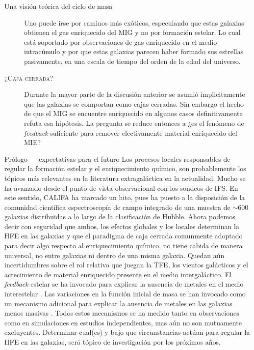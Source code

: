 \documentclass[xcolor=dvipsnames,4pt,hyperref={colorlinks,citecolor=black,linkcolor=black,urlcolor=black}]{beamer}
\begin{document}
\begin{frame}[allowframebreaks]{Una visión teórica del ciclo de masa}
\begin{description}
Uno puede irse por caminos más exóticos, especulando que estas galaxias obtienen el gas enriquecido
del MIG y no por formación estelar. Lo cual está soportado por observaciones de gas enriquecido en
el medio intracúmulo y por que estas galaxias parecen haber formado sus estrellas pasivamente, en
una escala de tiempo del orden de la edad del universo.
%
\item[\textsc{¿Caja cerrada?}] Durante la mayor parte de la discusión anterior se asumió
implicitamente que las galaxias se comportan como cajas cerradas. Sin embargo el hecho de que el MIG
se encuentre enriquecido en algunos casos definitivamente refuta esa hipótesis. La pregunta se
reduce entonces a ¿es el fenómeno de \emph{feedback} suficiente para remover efectivamente material
enriquecido del MIE?
%
\end{description}
\end{frame}

\begin{frame}[allowframebreaks]{Prólogo --- expectativas para el futuro}
%
Los procesos locales responsables de regular la formación estelar y el enriquecimiento químico, son
probablemente los tópicos más relevantes en la literatura extragaláctica en la actualidad. Mucho se
ha avanzado desde el punto de vista observacional con los sondeos de IFS. En este sentido, CALIFA ha
marcado un hito, pues ha puesto a la disposición de la comunidad científica espectroscopía de campo
integrado de una muestra de $\sim600$ galaxias distribuidas a lo largo de la clasificación de
Hubble. Ahora podemos decir con seguridad que ambos, los efectos globales y los locales determinan
la HFE en las galaxias y que el paradigma de caja cerrada comunmente adoptado para decir algo
respecto al enriquecimiento químico, no tiene cabida de manera universal, no entre galaxias ni
dentro de una misma galaxia. Quedan aún incertidumbres sobre el rol relativo que juegan la TFE, los
vientos galácticos y el acrecimiento de material enriquecido presente en el medio intergaláctico. El
\emph{feedback} estelar se ha invocado para explicar la ausencia de metales en el medio interestelar
\citep{Tremonti2004, Kobayashi2007}. Las variaciones en la función inicial de masa se han invocado
como un mecanismo adicional para explicar la ausencia de metales en las galaxias menos masivas
\citep{Koppen2007}. Todos estos mecanismos se ha medido tanto en observaciones como en simulaciones
en estudios independientes, mas aún no son mutuamente excluyentes. Determinar cual(es) y bajo que
circunstancias actúan para regular la HFE en las galaxias, será tópico de investigación por los
próximos años.
%
\end{frame}
\end{document}
